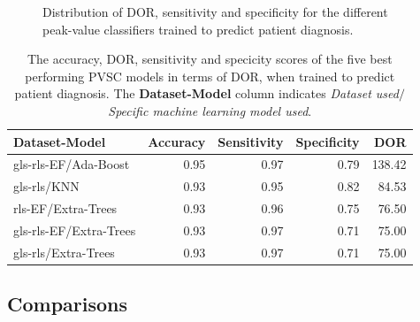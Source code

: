 \begin{figure}[H]
    \centering
    
    \caption{Distribution of DOR, sensitivity and specificity for the different peak-value classifiers trained to predict patient diagnosis.}
    \label{fig:pvmlc_ind_dor_sens_spec_dist}
\end{figure}

\begin{table}
    \centering
    \begin{tabular}{lrrrr}
        \toprule
        Dataset-Model              &  Accuracy &  Sensitivity &  Specificity &  DOR \\
        \midrule
        gls-rls-EF/Ada-Boost   &      0.95 &         0.97 &         0.79 & 138.42 \\
        gls-rls/KNN            &      0.93 &         0.95 &         0.82 &  84.53 \\
        rls-EF/Extra-Trees     &      0.93 &         0.96 &         0.75 &  76.50 \\
        gls-rls-EF/Extra-Trees &      0.93 &         0.97 &         0.71 &  75.00 \\
        gls-rls/Extra-Trees    &      0.93 &         0.97 &         0.71 &  75.00 \\
        \bottomrule
    \end{tabular}
    \caption{The accuracy, DOR, sensitivity and specicity scores of the five best performing PVSC models in terms of DOR, when trained to predict patient diagnosis.
             The \textbf{Dataset-Model} column indicates \textit{Dataset used}$/$\textit{Specific machine learning model used}.}
    \label{tab:dl_hf_dor_sens_spec_dist}
\end{table}

\newpage

\subsection{Comparisons}

\newpage

